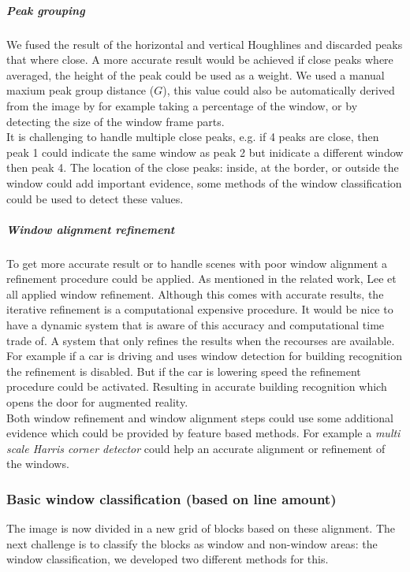 \subparagraph{Peak grouping}
We fused the result of the horizontal and vertical Houghlines and discarded
peaks that where close.  A more accurate result would be achieved if close peaks
where averaged, the height of the peak could be used as a weight.  We used a
manual maxium peak group distance ($G$), this value could also be automatically
derived from the image by for example taking a percentage of the window, or by
detecting the size of the window frame parts.\\ It is challenging to handle
multiple close peaks, e.g. if 4 peaks are close, then peak 1 could indicate the
same window as peak 2 but inidicate a different window then peak 4. The location
of the close peaks: inside, at the border, or outside the window could add
important evidence, some methods of the window classification could be used to
detect these values.

\subparagraph{Window alignment refinement}
To get more accurate result or to handle scenes with poor window alignment a
refinement procedure could be applied.  As mentioned in the related work, Lee et
all \cite{Lee_extraction} applied window refinement.  Although this comes with
accurate results, the iterative refinement is a computational expensive
procedure.  It would be nice to have a dynamic system that is aware of this
accuracy and computational time trade of. A system that only refines the results
when the recourses are available.  For example if a car is driving and uses
window detection for building recognition the refinement is disabled.  But if
the car is lowering speed the refinement procedure could be activated.
Resulting in accurate building recognition which opens the door for augmented
reality.\\

Both window refinement and window alignment steps could use some additional
evidence which could be provided by feature based methods.  For example a
\emph{multi scale Harris corner detector} could help an accurate alignment or
refinement of the windows.








\subsubsection{Basic window classification (based on line amount)}
The image is now divided in a new grid of blocks based on these
alignment. The next challenge is to classify the blocks as window and
non-window areas: the window classification, we developed two different methods for this.

